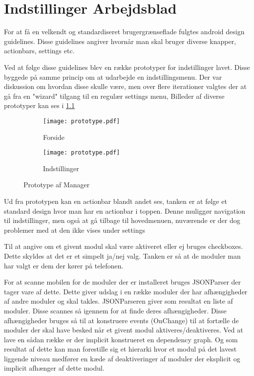 \chapter{Indstillinger Arbejdsblad}
For at få en velkendt og standardiseret brugergrænseflade fulgtes android design guidelines.
Disse guidelines angiver hvornår man skal bruger diverse knapper, actionbars, settings etc.

Ved at følge disse guidelines blev en række prototyper for indstillinger lavet.
Disse byggede på samme princip om at udarbejde en indstillingsmenu.
Der var diskussion om hvordan disse skulle være, men over flere iterationer valgtes der at gå fra en "wizard" tilgang til en regulær settings menu,
Billeder af diverse prototyper kan ses i \cref{fig:prototype-manager}

\begin{figure}
	\centering
	\begin{subfigure}[b]{0.45\textwidth}
			\texttt{[image: prototype.pdf]}
			\caption{Forside}
	\end{subfigure}
	\begin{subfigure}[b]{0.45\textwidth}
			\texttt{[image: prototype.pdf]}
			\caption{Indstillinger}
	\end{subfigure}
	\caption{Prototype af Manager}
	\label{fig:prototype-manager}
\end{figure}


Ud fra prototypen kan en actionbar blandt andet ses, tanken er at følge et standard design hvor man har en actionbar i toppen.
Denne muliggør navigation til indstillinger, men også at gå tilbage til hovedmenuen, nuværende er der dog problemer med at den ikke vises under settings

Til at angive om et givent modul skal være aktiveret eller ej bruges checkboxes.
Dette skyldes at det er et simpelt ja/nej valg. 
Tanken er så at de moduler man har valgt er dem der kører på telefonen.

For at scanne mobilen for de moduler der er installeret bruges JSONParser der tager vare af dette. 
Dette giver udslag i en række moduler der har afhængigheder af andre moduler og skal takles.
JSONParseren giver som resultat en liste af moduler. Disse scannes så igennem for at finde deres afhængigheder.
Disse afhængigheder bruges så til at konstruere events (OnChange) til at fortælle de moduler der skal have besked når et givent modul aktiveres/deaktiveres.
Ved at lave en sådan række er der implicit konstrueret en dependency graph.
Og som resultat af dette kan man forestille sig et hierarki hvor et modul på det lavest liggende niveau medfører en kæde af deaktiveringer af moduler der eksplicit og implicit afhænger af dette modul.

